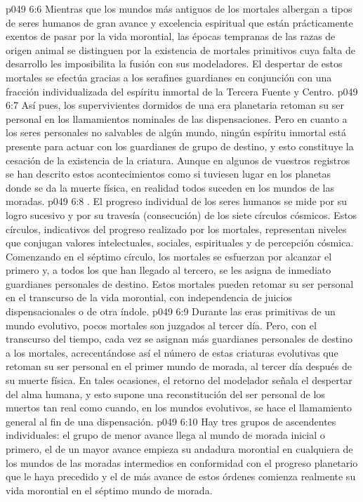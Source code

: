 \vs p049 6:6 Mientras que los mundos más antiguos de los mortales albergan a tipos de seres humanos de gran avance y excelencia espiritual que están prácticamente exentos de pasar por la vida morontial, las épocas tempranas de las razas de origen animal se distinguen por la existencia de mortales primitivos cuya falta de desarrollo les imposibilita la fusión con sus modeladores. El despertar de estos mortales se efectúa gracias a los serafines guardianes en conjunción con una fracción individualizada del espíritu inmortal de la Tercera Fuente y Centro.
\vs p049 6:7 Así pues, los supervivientes dormidos de una era planetaria retoman su ser personal en los llamamientos nominales de las dispensaciones. Pero en cuanto a los seres personales no salvables de algún mundo, ningún espíritu inmortal está presente para actuar con los guardianes de grupo de destino, y esto constituye la cesación de la existencia de la criatura. Aunque en algunos de vuestros registros se han descrito estos acontecimientos como si tuviesen lugar en los planetas donde se da la muerte física, en realidad todos suceden en los mundos de las moradas.
\vs p049 6:8 \pc {}. El progreso individual de los seres humanos se mide por su logro sucesivo y por su travesía (consecución) de los siete círculos cósmicos. Estos círculos, indicativos del progreso realizado por los mortales, representan niveles que conjugan valores intelectuales, sociales, espirituales y de percepción cósmica. Comenzando en el séptimo círculo, los mortales se esfuerzan por alcanzar el primero y, a todos los que han llegado al tercero, se les asigna de inmediato guardianes personales de destino. Estos mortales pueden retomar su ser personal en el transcurso de la vida morontial, con independencia de juicios dispensacionales o de otra índole.
\vs p049 6:9 Durante las eras primitivas de un mundo evolutivo, pocos mortales son juzgados al tercer día. Pero, con el transcurso del tiempo, cada vez se asignan más guardianes personales de destino a los mortales, acrecentándose así el número de estas criaturas evolutivas que retoman su ser personal en el primer mundo de morada, al tercer día después de su muerte física. En tales ocasiones, el retorno del modelador señala el despertar del alma humana, y esto supone una reconstitución del ser personal de los muertos tan real como cuando, en los mundos evolutivos, se hace el llamamiento general al fin de una dispensación.
\vs p049 6:10 Hay tres grupos de ascendentes individuales: el grupo de menor avance llega al mundo de morada inicial o primero, el de un mayor avance empieza su andadura morontial en cualquiera de los mundos de las moradas intermedios en conformidad con el progreso planetario que le haya precedido y el de más avance de estos órdenes comienza realmente su vida morontial en el séptimo mundo de morada.
